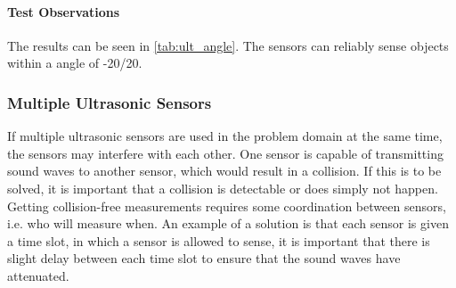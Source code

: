 \paragraph{Test Observations}
The results can be seen in \cref{tab:ult_angle}. The sensors can reliably sense objects within a angle of -20\degree/20\degree.

\subsubsection{Multiple Ultrasonic Sensors}
If multiple ultrasonic sensors are used in the problem domain at the same time, the sensors may interfere with each other. One sensor is capable of transmitting sound waves to another sensor, which would result in a collision. If this is to be solved, it is important that a collision is detectable or does simply not happen. Getting collision-free measurements requires some coordination between sensors, i.e. who will measure when. An example of a solution is that each sensor is given a time slot, in which a sensor is allowed to sense, it is important that there is slight delay between each time slot to ensure that the sound waves have attenuated.
